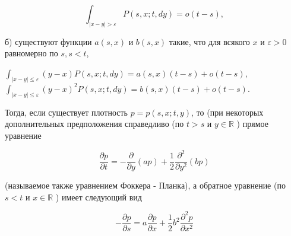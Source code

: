 \documentclass[10pt]{article}
\begin{document}
\[

\int_{|x-y|>\varepsilon} P(s, x ; t, d y)=o(t-s),

\]



б) существуют функции $a(s, x)$ и $b(s, x)$ такие, что для всякого $x$ и $\varepsilon>0$ равномерно по $s, s<t$,



$\int_{|x-y| \leqslant \varepsilon}(y-x) P(s, x ; t, d y)=a(s, x)(t-s)+o(t-s)$, $\int_{|x-y| \leqslant \varepsilon}(y-x)^{2} P(s, x ; t, d y)=b(s, x)(t-s)+o(t-s)$.



Тогда, если существует плотность $p=p(s, x ; t, y)$, то (при некоторых дополнительных предположения справедливо (по $t>s$ и $y \in \mathbb{R}$ ) прямое уравнение



\[

\frac{\partial p}{\partial t}=-\frac{\partial}{\partial y}(a p)+\frac{1}{2} \frac{\partial^{2}}{\partial y^{2}}(b p)

\]



(называемое также уравнением Фоккера - Планка), а обратное уравнение (по $s<t$ и $x \in \mathbb{R}$ ) имеет следующий вид



\[

-\frac{\partial p}{\partial s}=a \frac{\partial p}{\partial x}+\frac{1}{2} b^{2} \frac{\partial^{2} p}{\partial x^{2}}

\]
\end{document}
